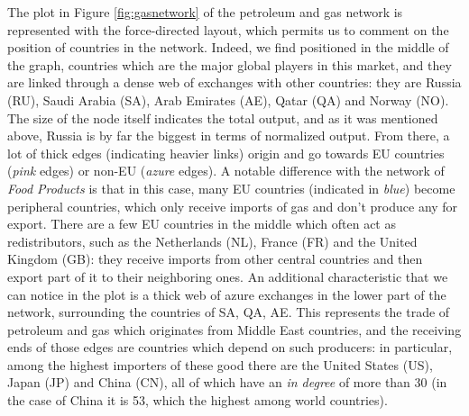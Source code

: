 The plot in Figure \ref{fig:gasnetwork} of the petroleum and gas network is represented with the force-directed layout, which permits us to comment on the position of countries in the network. Indeed, we find positioned in the middle of the graph, countries which are the major global players in this market, and they are linked through a dense web of exchanges with other countries: they are Russia (RU), Saudi Arabia (SA), Arab Emirates (AE), Qatar (QA) and Norway (NO). The size of the node itself indicates the total output, and as it was mentioned above, Russia is by far the biggest in terms of normalized output. From there, a lot of thick edges (indicating heavier links) origin and go towards EU countries (\textit{pink} edges) or non-EU (\textit{azure} edges). A notable difference with the network of \textit{Food Products} is that in this case, many EU countries (indicated in \textit{blue}) become peripheral countries, which only receive imports of gas and don't produce any for export. There are a few EU countries in the middle which often act as redistributors, such as the Netherlands (NL), France (FR) and the United Kingdom (GB): they receive imports from other central countries and then export part of it to their neighboring ones. An additional characteristic that we can notice in the plot is a thick web of azure exchanges in the lower part of the network, surrounding the countries of SA, QA, AE. This represents the trade of petroleum and gas which originates from Middle East countries, and the receiving ends of those edges are countries which depend on such producers: in particular, among the highest importers of these good there are the United States (US), Japan (JP) and China (CN), all of which have an \textit{in degree} of more than 30 (in the case of China it is 53, which the highest among world countries).


